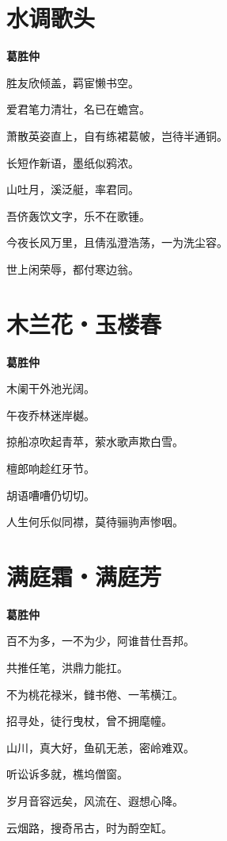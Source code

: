 \documentclass[12pt,a4paper]{ctexbook}
\begin{document}
\section{水调歌头}
\textbf{葛胜仲}\par\vspace{0.5em}
胜友欣倾盖，羁宦懒书空。\par
爱君笔力清壮，名已在蟾宫。\par
萧散英姿直上，自有练裙葛帔，岂待半通铜。\par
长短作新语，墨纸似鸦浓。\par
山吐月，溪泛艇，率君同。\par
吾侪轰饮文字，乐不在歌锺。\par
今夜长风万里，且倩泓澄浩荡，一为洗尘容。\par
世上闲荣辱，都付寒边翁。\par

\section{木兰花・玉楼春}
\textbf{葛胜仲}\par\vspace{0.5em}
木阑干外池光阔。\par
午夜乔林迷岸樾。\par
掠船凉吹起青苹，萦水歌声欺白雪。\par
檀郎响趁红牙节。\par
胡语嘈嘈仍切切。\par
人生何乐似同襟，莫待骊驹声惨咽。\par

\section{满庭霜・满庭芳}
\textbf{葛胜仲}\par\vspace{0.5em}
百不为多，一不为少，阿谁昔仕吾邦。\par
共推任笔，洪鼎力能扛。\par
不为桃花禄米，雠书倦、一苇横江。\par
招寻处，徒行曳杖，曾不拥麾幢。\par
山川，真大好，鱼矶无恙，密岭难双。\par
听讼诉多就，樵坞僧窗。\par
岁月音容远矣，风流在、遐想心降。\par
云烟路，搜奇吊古，时为酹空缸。\par
\end{document}
